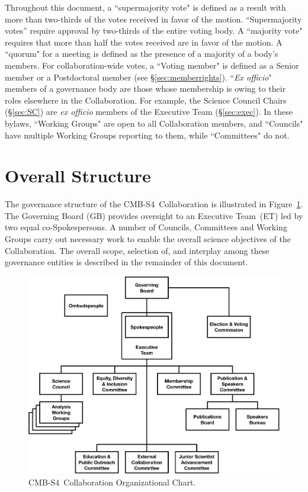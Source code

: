 \documentclass[12pt]{article}
\newcommand{\exec}{{Executive Team}}
\newcommand\collabname{CMB-S4}
\begin{document}
Throughout this document,  a ``supermajority vote" is defined as a result with more than two-thirds of the votes received in favor of  the motion. ``Supermajority votes'' require approval by two-thirds of the entire voting body. A ``majority vote" requires that more than half the votes received are in favor of the motion.   A ``quorum" for a meeting is defined as the presence of a majority of a body's members.   For collaboration-wide votes, a ``Voting member" is  defined as a Senior member or a Postdoctoral member (see \S\ref{sec:memberrights}). ``{\it Ex officio}" members of a governance body are those whose membership is owing to their roles elsewhere in the Collaboration.  For example, the Science Council Chairs (\S\ref{sec:SC}) are {\it ex officio} members of the Executive Team (\S\ref{sec:exec}).  In these bylaws,  ``Working Groups" are open to all Collaboration members, and ``Councils" have multiple Working Groups reporting to them, while ``Committees" do not.  

\section{Overall Structure}

The governance structure of the \collabname\ Collaboration is illustrated in Figure~\ref{fig:org_chart}.  The Governing Board (GB) provides oversight to an \exec\ (ET) led by two equal co-Spokespersons.  A number of Councils, Committees and Working Groups carry out necessary work to enable the overall science objectives of the Collaboration. The overall scope, selection of, and interplay among these governance entities is described in the remainder of this document. 

\begin{figure}[h!]
\begin{center}
\includegraphics[width=6.5in]{cmbs4_org_v11.pdf}
\end{center}
\caption{\collabname\ Collaboration Organizational Chart. }
\label{fig:org_chart}
\end{figure}
\end{document}

